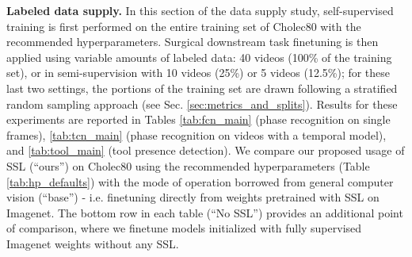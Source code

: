 \documentclass[times,twocolumn,final]{elsarticle}
\begin{document}
\noindent\textbf{Labeled data supply. }
In this section of the data supply study, self-supervised training is first performed on the entire training set of Cholec80 with the recommended hyperparameters. Surgical downstream task finetuning is then applied using variable amounts of labeled data: 40 videos (100\% of the training set), or in semi-supervision with 10 videos (25\%) or 5 videos (12.5\%); for these last two settings, the portions of the training set are drawn following a stratified random sampling approach (see Sec. \ref{sec:metrics_and_splits}). Results for these experiments are reported in Tables \ref{tab:fcn_main} (phase recognition on single frames), \ref{tab:tcn_main} (phase recognition on videos with a temporal model), and \ref{tab:tool_main} (tool presence detection). We compare our proposed usage of SSL (``ours'') on Cholec80 using the recommended hyperparameters (Table \ref{tab:hp_defaults}) with the mode of operation borrowed from general computer vision (``base'') - i.e. finetuning directly from weights pretrained with SSL on Imagenet. The bottom row in each table (``No SSL'') provides an additional point of comparison, where we finetune models initialized with fully supervised Imagenet weights without any SSL.
\end{document}
